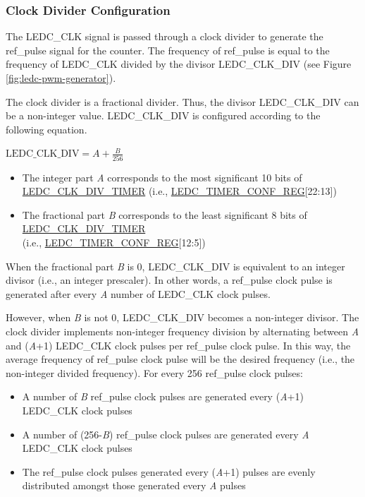 \documentclass[main\_\_EN.tex]{subfiles}
\begin{document}
\subsubsection{Clock Divider Configuration}

The LEDC\_CLK signal is passed through a clock divider to generate the ref\_pulse signal for the counter. The frequency of ref\_pulse is equal to the frequency of LEDC\_CLK divided by the divisor LEDC\_CLK\_DIV (see Figure \ref{fig:ledc-pwm-generator}).

The clock divider is a fractional divider. Thus, the divisor LEDC\_CLK\_DIV can be a non-integer value. LEDC\_CLK\_DIV is configured according to the following equation.

\begin{center}
$\textrm{LEDC\_CLK\_DIV} = A + \frac{B}{256}$
\end{center}

\begin{itemize}
    \item The integer part \textit{A} corresponds to the most significant 10 bits of \hyperref[fielddesc:LEDCCLKDIVTIMERX]{LEDC\_CLK\_DIV\_TIMER} (i.e., \hyperref[regdesc:LEDCTIMERXCONFREG]{LEDC\_TIMER\_CONF\_REG}[22:13])
    \item The fractional part \textit{B} corresponds to the least significant 8 bits of \hyperref[fielddesc:LEDCCLKDIVTIMERX]{LEDC\_CLK\_DIV\_TIMER} \\(i.e., \hyperref[regdesc:LEDCTIMERXCONFREG]{LEDC\_TIMER\_CONF\_REG}[12:5])
\end{itemize}

When the fractional part \textit{B} is 0, LEDC\_CLK\_DIV is equivalent to an integer divisor (i.e., an integer prescaler). In other words, a ref\_pulse clock pulse is generated after every \textit{A} number of LEDC\_CLK clock pulses.

However, when \textit{B} is not 0, LEDC\_CLK\_DIV becomes a non-integer divisor. The clock divider implements non-integer frequency division by alternating between \textit{A} and (\textit{A}+1) LEDC\_CLK clock pulses per ref\_pulse clock pulse. In this way, the average frequency of ref\_pulse clock pulse will be the desired frequency (i.e., the non-integer divided frequency). For every 256 ref\_pulse clock pulses:

\begin{itemize}
    \item A number of \textit{B} ref\_pulse clock pulses are generated every (\textit{A}+1) LEDC\_CLK clock pulses
    \item A number of (256-\textit{B}) ref\_pulse clock pulses are generated every \textit{A} LEDC\_CLK clock pulses
    \item The ref\_pulse clock pulses generated every (\textit{A}+1) pulses are evenly distributed amongst those generated every \textit{A} pulses
\end{itemize}
\end{document}
